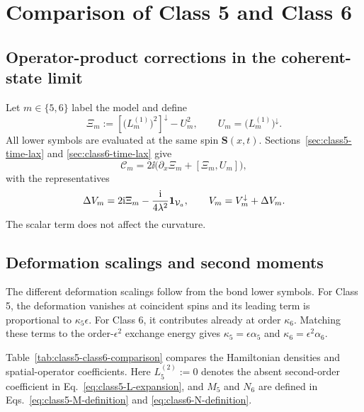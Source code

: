 \section{Comparison of Class 5 and Class 6}
\label{sec:comparison}

\subsection{Operator-product corrections in the coherent-state limit}
\label{sec:comparison-symbol-products}

Let $m\in\{5,6\}$ label the model and define
\begin{equation}
\Xi_m
:=\left[\bigl(L_m^{(1)}\bigr)^2\right]^\downarrow-U_m^2,
\qquad
U_m=\bigl(L_m^{(1)}\bigr)^\downarrow.
\label{eq:comparison-symbol-square-difference}
\end{equation}
All lower symbols are evaluated at the same spin
$\boldsymbol S(x,t)$.  Sections~\ref{sec:class5-time-lax} and
\ref{sec:class6-time-lax} give
\begin{equation}
\mathcal C_m
=2\ii\bigl(\partial_x\Xi_m+[\Xi_m,U_m]\bigr),
\label{eq:comparison-common-source}
\end{equation}
with the representatives
\begin{equation}
\Delta V_m
=2\mathrm{i}\Xi_m-\frac{\mathrm{i}}{4\lambda^2}\mathbf{1}_{\mathcal V_a},
\qquad
V_m=V_m^\downarrow+\Delta V_m.
\label{eq:comparison-common-correction}
\end{equation}
The scalar term does not affect the curvature.

\subsection{Deformation scalings and second moments}
\label{sec:comparison-model-dependence}

The different deformation scalings follow from the bond lower symbols.  For
Class 5, the deformation vanishes at coincident spins and its leading term is
proportional to $\kappa_5\epsilon$.  For Class 6, it contributes already at
order $\kappa_6$.  Matching these terms to the order-$\epsilon^2$ exchange
energy gives $\kappa_5=\epsilon\alpha_5$ and
$\kappa_6=\epsilon^2\alpha_6$.

Table~\ref{tab:class5-class6-comparison} compares the Hamiltonian densities
and spatial-operator coefficients.  Here $L_5^{(2)}:=0$ denotes the absent
second-order coefficient in Eq.~\eqref{eq:class5-L-expansion}, and $M_5$ and
$N_6$ are defined in Eqs.~\eqref{eq:class5-M-definition} and
\eqref{eq:class6-N-definition}.

